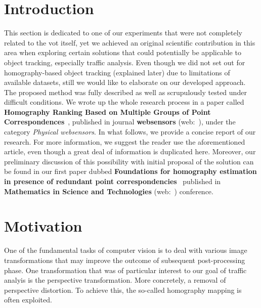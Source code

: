 \section{Introduction}
\label{sec:HomographyIntroduction}

This section is dedicated to one of our experiments that were not completely related to the \gls{vot} itself, yet we achieved an original scientific contribution in this area when exploring certain solutions that could potentially be applicable to object tracking, especially traffic analysis. Even though we did not set out for homography-based object tracking (explained later) due to limitations of available datasets, still we would like to elaborate on our developed approach. The proposed method was fully described as well as scrupulously tested under difficult conditions. We wrote up the whole research process in a paper called \textbf{Homography Ranking Based on Multiple Groups of Point Correspondences}~\cite{ondrasovic2021homography}, published in journal \textbf{websensors} (web:~\cite{websensors}), under the category \emph{Physical websensors}. In what follows, we provide a concise report of our research. For more information, we suggest the reader use the aforementioned article, even though a great deal of information is duplicated here. Moreover, our preliminary discussion of this possibility with initial proposal of the solution can be found in our first paper dubbed \textbf{Foundations for homography estimation in presence of redundant point correspondencies}~\cite{ondrasovic2020foundations} published in \textbf{Mathematics in Science and Technologies} (web:~\cite{webmistconf}) conference.

\section{Motivation}
\label{sec:HomographyMotivation}

One of the fundamental tasks of computer vision is to deal with various image transformations that may improve the outcome of subsequent post-processing phase. One transformation that was of particular interest to our goal of traffic analyis is the perspective transformation. More concretely, a removal of perspective distortion. To achieve this, the so-called homography mapping is often exploited.

